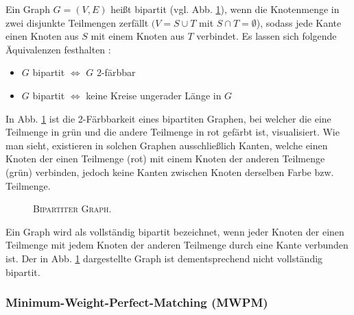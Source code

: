 Ein Graph $G = (V, E)$ heißt bipartit (vgl. Abb. \ref{fig:digression_bipartite_graph}), wenn die Knotenmenge in zwei disjunkte Teilmengen zerfällt
$(V = S \cup T$ mit $S \cap T = \emptyset$), sodass jede Kante einen Knoten aus $S$ mit einem Knoten aus $T$ verbindet. \cite{HochschuleDarmstadt}\newline
Es lassen sich folgende Äquivalenzen festhalten \cite{Leighton2010}:
\begin{itemize}
  \item $G$ bipartit $\iff$ $G$ 2-färbbar
  \item $G$ bipartit $\iff$ keine Kreise ungerader Länge in $G$
\end{itemize}
In Abb. \ref{fig:digression_bipartite_graph} ist die 2-Färbbarkeit eines bipartiten Graphen, bei welcher die eine Teilmenge
in grün und die andere Teilmenge in rot gefärbt ist, visualisiert. Wie man sieht, existieren in solchen Graphen
ausschließlich Kanten, welche einen Knoten der einen Teilmenge (rot) mit einem Knoten der anderen Teilmenge (grün) verbinden,
jedoch keine Kanten zwischen Knoten derselben Farbe bzw. Teilmenge.

\begin{figure}[H]
\centering
{}
\caption{\textsc{Bipartiter Graph.}}
\label{fig:digression_bipartite_graph}
\end{figure}

Ein Graph wird als vollständig bipartit bezeichnet, wenn jeder Knoten der einen Teilmenge mit jedem Knoten
der anderen Teilmenge durch eine Kante verbunden ist. Der in Abb. \ref{fig:digression_bipartite_graph}
dargestellte Graph ist dementsprechend nicht vollständig bipartit.

\subsubsection{Minimum-Weight-Perfect-Matching (\textsc{MWPM})}
\label{sec:digression_mwpm}

